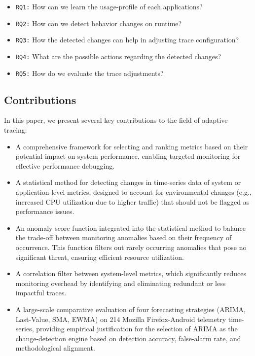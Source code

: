 \documentclass[pdflatex,sn-nature]{sn-jnl}%
\theoremstyle{thmstyleone}%
\theoremstyle{thmstyletwo}%
\theoremstyle{thmstylethree}%
\begin{document}
\begin{itemize}
  \item \verb|RQ1:| How can we learn the usage-profile of each applications?
  \item \verb|RQ2:| How can we detect behavior changes on runtime?
  \item \verb|RQ3:| How the detected changes can help in adjusting trace configuration?
  \item \verb|RQ4:| What are the possible actions regarding the detected changes?
  \item \verb|RQ5:| How do we evaluate the trace adjustments?
\end{itemize}

\subsection{Contributions}
In this paper, we present several key contributions to the field of adaptive tracing:
\begin{itemize}
\item A comprehensive framework for selecting and ranking metrics based on their potential impact on system performance, enabling targeted monitoring for effective performance debugging.
\item A statistical method for detecting changes in time-series data of system or application-level metrics, designed to account for environmental changes (e.g., increased CPU utilization due to higher traffic) that should not be flagged as performance issues.
\item An anomaly score function integrated into the statistical method to balance the trade-off between monitoring anomalies based on their frequency of occurrence. This function filters out rarely occurring anomalies that pose no significant threat, ensuring efficient resource utilization.
\item A correlation filter between system-level metrics, which significantly reduces monitoring overhead by identifying and eliminating redundant or less impactful traces.
\item A large-scale comparative evaluation of four forecasting strategies (ARIMA, Last-Value, SMA, EWMA) on 214 Mozilla Firefox-Android telemetry time-series, providing empirical justification for the selection of ARIMA as the change-detection engine based on detection accuracy, false-alarm rate, and methodological alignment.
\end{itemize}
\end{document}
